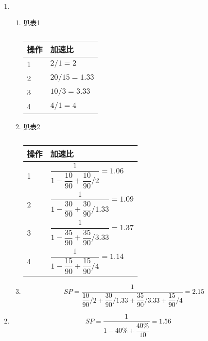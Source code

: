 \documentclass[11pt]{article}
\begin{document}
\begin{enumerate}
  \item 
    \begin{enumerate}
      \item 见表\ref{tab: tab2}
        \begin{table}[htbp]
        \centering
          \begin{tabular}{ll}
            \hline
            操作&加速比\\
            \hline
            1 & $2/1 = 2$ \\
            2 & $20/15 = 1.33$ \\
            3 & $10/3 = 3.33$ \\
            4 & $4/1 = 4$ \\
            \hline
          \end{tabular}
        \caption{\label{tab: tab2}}
        \end{table}
      \item 见表\ref{tab: tab3}
        \begin{table}[htbp]
        \centering
          \begin{tabular}{ll}
            \hline
            操作&加速比\\
            \hline
            1 & $\dfrac{1}{1-\dfrac{10}{90} + \dfrac{10}{90}/2} = 1.06$ \\
            2 & $\dfrac{1}{1-\dfrac{30}{90} + \dfrac{30}{90}/1.33} = 1.09$ \\
            3 & $\dfrac{1}{1-\dfrac{35}{90} + \dfrac{35}{90}/3.33} = 1.37$ \\
            4 & $\dfrac{1}{1-\dfrac{15}{90} + \dfrac{15}{90}/4} = 1.14$ \\
            \hline
          \end{tabular}
        \caption{\label{tab: tab3}}
        \end{table}
      \item
        \[ SP = \dfrac{1}{\dfrac{10}{90}/2 + \dfrac{30}{90}/1.33 + \dfrac{35}{90}/3.33 + \dfrac{15}{90}/4} = 2.15 \]
    \end{enumerate}
  \item 
    \[ SP = \dfrac{1}{1-40\%+\dfrac{40\%}{10}} = 1.56 \]
\end{enumerate}
\end{document}
